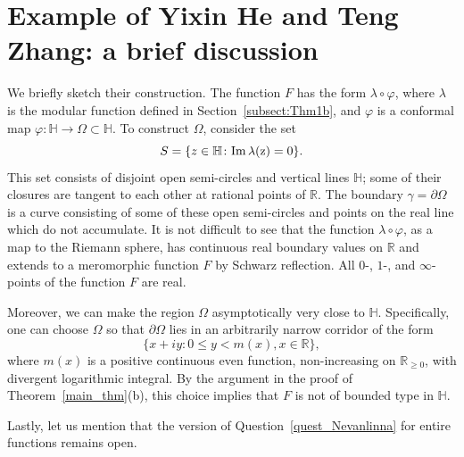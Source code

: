 \documentclass[12pt]{paper}
\newcommand{\bR}{\mathbb R}
\newcommand{\bH}{\mathbb H}
\newcommand{\la}{\lambda}
\renewcommand{\phi}{\varphi}
\begin{document}
\section{Example of Yixin He and Teng Zhang: a brief discussion}
\label{sect:brief}

We briefly sketch their construction. The function $F$ has the form
$\lambda\circ\phi$, where $\lambda$
is the modular function defined in Section~\ref{subsect:Thm1b}, and $\phi$ is a conformal map
$\phi\colon \bH\to\Omega\subset\bH$. To construct $\Omega$, consider the set
\[
S =\{ z\in \bH\colon  \rm{Im\,}\lambda(z)=0\}.
\]
This set consists of disjoint open semi-circles and vertical lines $\bH$; 
some of  their closures are tangent to each other at rational points of $\bR$. The boundary 
$\gamma=\partial\Omega$ is a curve
consisting of some of these open semi-circles and points on the real line which do not accumulate. 
It is not difficult to see that the function $\la\circ\phi$, as a map to the Riemann sphere, 
has continuous real boundary values on $\bR$ and extends to a meromorphic function $F$ 
by Schwarz reflection. All $0$-, $1$-, and $\infty$-points of the function $F$ are real.


Moreover, we can make the region $\Omega$ asymptotically very close to $\bH$. 
Specifically,
one can choose $\Omega$ so that $\partial \Omega$ lies in an arbitrarily
narrow corridor of the form \[ \{ x+iy\colon 0\le y<m(x), x\in\bR\}, \]
where $m(x)$ is
a positive continuous even function, non-increasing on $\bR_{\ge 0}$, with
divergent logarithmic integral.
By the argument in the proof of Theorem~\ref{main_thm}(b),  this choice 
implies that $F$ is not of bounded type in $\bH$.

Lastly, let us mention that the  version of Question~\ref{quest_Nevanlinna}
for entire functions remains open.
\end{document}
